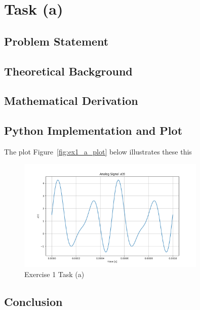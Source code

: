 \usepackage{graphicx}\item[(a)]
\section*{Task (a)}

\subsection*{Problem Statement}

\subsection*{Theoretical Background}

\subsection*{Mathematical Derivation}

\subsection*{Python Implementation and Plot}
The plot Figure~\ref{fig:ex1_a_plot} below illustrates these this

\begin{figure}[h]
    \centering
    \includegraphics[width=0.8\textwidth]{fig/ex1_a_plot}
    \caption{Exercise 1 Task (a)}
\end{figure}

\subsection*{Conclusion}